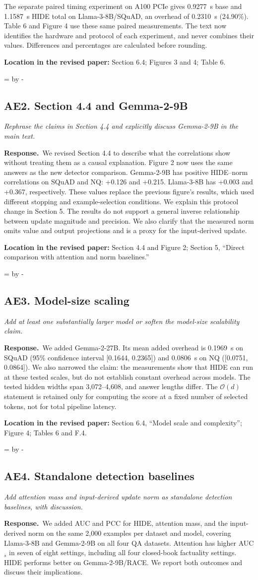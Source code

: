 \documentclass[11pt]{article}
\newcommand{\Needspace}[1]{\par\begingroup
  \dimen0=\pagegoal\advance\dimen0 by -\pagetotal
  \ifdim\dimen0<#1\relax\newpage\fi\endgroup}
\newcommand{\reviewcomment}[2]{%
  \Needspace{9\baselineskip}%
  \subsection*{#1}%
  \begin{tcolorbox}[enhanced,breakable,colback=gray!8,colframe=gray!50,
    boxrule=0pt,borderline west={2pt}{0pt}{gray!55},sharp corners]
  \itshape #2
  \end{tcolorbox}}
\newcommand{\response}{\textbf{Response.}\ }
\newcommand{\location}[1]{\par\textbf{Location in the revised paper:} #1\par}
\begin{document}
The separate paired timing experiment on A100 PCIe gives 0.9277~s base and 1.1587~s HIDE total on Llama-3-8B/SQuAD, an overhead of 0.2310~s (24.90\%). Table 6 and Figure 4 use these same paired measurements. The text now identifies the hardware and protocol of each experiment, and never combines their values. Differences and percentages are calculated before rounding.
\location{Section 6.4; Figures 3 and 4; Table 6.}

\reviewcomment{AE2. Section 4.4 and Gemma-2-9B}{Rephrase the claims in Section 4.4 and explicitly discuss Gemma-2-9B in the main text.}
\response We revised Section 4.4 to describe what the correlations show without treating them as a causal explanation. Figure 2 now uses the same answers as the new detector comparison. Gemma-2-9B has positive HIDE--norm correlations on SQuAD and NQ: +0.126 and +0.215. Llama-3-8B has +0.003 and +0.367, respectively. These values replace the previous figure's results, which used different stopping and example-selection conditions. We explain this protocol change in Section 5. The results do not support a general inverse relationship between update magnitude and precision. We also clarify that the measured norm omits value and output projections and is a proxy for the input-derived update.
\location{Section 4.4 and Figure 2; Section 5, ``Direct comparison with attention and norm baselines.''}

\reviewcomment{AE3. Model-size scaling}{Add at least one substantially larger model or soften the model-size scalability claim.}
\response We added Gemma-2-27B. Its mean added overhead is 0.1969~s on SQuAD (95\% confidence interval [0.1644, 0.2365]) and 0.0806~s on NQ ([0.0751, 0.0864]). We also narrowed the claim: the measurements show that HIDE can run at these tested scales, but do not establish constant overhead across models. The tested hidden widths span 3,072--4,608, and answer lengths differ. The $\mathcal O(d)$ statement is retained only for computing the score at a fixed number of selected tokens, not for total pipeline latency.
\location{Section 6.4, ``Model scale and complexity''; Figure 4; Tables 6 and F.4.}

\reviewcomment{AE4. Standalone detection baselines}{Add attention mass and input-derived update norm as standalone detection baselines, with discussion.}
\response We added AUC and PCC for HIDE, attention mass, and the input-derived norm on the same 2,000 examples per dataset and model, covering Llama-3-8B and Gemma-2-9B on all four QA datasets. Attention has higher AUC$_s$ in seven of eight settings, including all four closed-book factuality settings. HIDE performs better on Gemma-2-9B/RACE. We report both outcomes and discuss their implications.
\end{document}
